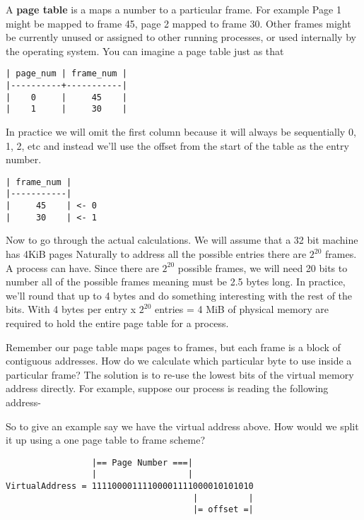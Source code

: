 A \textbf{page table} is a maps a number to a particular frame.
For example Page 1 might be mapped to frame 45, page 2 mapped to frame 30.
Other frames might be currently unused or assigned to other running processes, or used internally by the operating system.
You can imagine a page table just as that

\begin{verbatim}
| page_num | frame_num |
|----------+-----------|
|    0     |     45    |
|    1     |     30    |
\end{verbatim}

In practice we will omit the first column because it will always be sequentially 0, 1, 2, etc and instead we'll use the offset from the start of the table as the entry number.


\begin{verbatim}
| frame_num |
|-----------|
|     45    | <- 0
|     30    | <- 1
\end{verbatim}

Now to go through the actual calculations.
We will assume that a 32 bit machine has 4KiB pages
Naturally to address all the possible entries there are $2^{20}$ frames.
A process can have.
Since there are $2^{20}$ possible frames, we will need 20 bits to number all of the possible frames meaning  must be 2.5 bytes long.
In practice, we'll round that up to 4 bytes and do something interesting with the rest of the bits.
With 4 bytes per entry x $2^{20}$ entries = 4 MiB of physical memory are required to hold the entire page table for a process.

Remember our page table maps pages to frames, but each frame is a block of contiguous addresses.
How do we calculate which particular byte to use inside a particular frame?
The solution is to re-use the lowest bits of the virtual memory address directly.
For example, suppose our process is reading the following address- 

So to give an example say we have the virtual address above.
How would we split it up using a one page table to frame scheme?

\begin{verbatim}
                 |== Page Number ===|
                 |                  | 
VirtualAddress = 11110000111100001111000010101010
                                     |          |
                                     |= offset =|
\end{verbatim}

